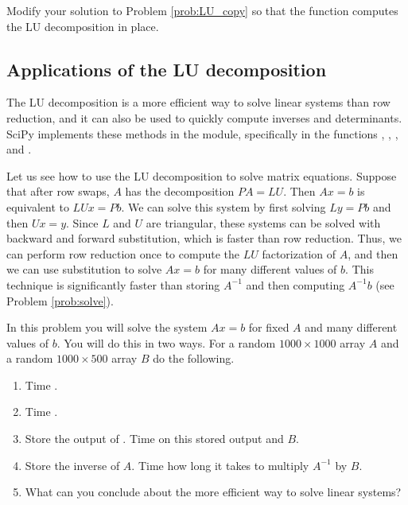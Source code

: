 \begin{problem}
Modify your solution to Problem \ref{prob:LU_copy} so that the function computes the LU decomposition in place.
\end{problem}

\subsection*{Applications of the LU decomposition} %

The LU decomposition is a more efficient way to solve linear systems than row reduction, and it can also be used to quickly compute inverses and determinants.
SciPy implements these methods in the  module, specifically in the functions , , , and .

Let us see how to use the LU decomposition to solve matrix equations.
Suppose that after row swaps, $A$ has the decomposition $PA = LU$.
Then $Ax=b$ is equivalent to $LUx=Pb$.
We can solve this system by first solving $Ly = Pb$ and then $Ux = y$.
Since $L$ and $U$ are triangular, these systems can be solved with backward and forward substitution, which is faster than row reduction.
Thus, we can perform row reduction once to compute the $LU$ factorization of $A$, and then we can use substitution to solve $Ax=b$ for many different values of $b$.
This technique is significantly faster than storing $A^{-1}$ and then computing $A^{-1}b$ (see Problem \ref{prob:solve}).

\begin{problem}\label{prob:solve}
In this problem you will solve the system $Ax = b$ for fixed $A$ and many different values of $b$.
You will do this in two ways.
For a random $1000 \times 1000$ array $A$ and a random $1000 \times 500$ array $B$ do the following.
\begin{enumerate}
\item Time .
\item Time .
\item Store the output of . Time  on this stored output and $B$.
\item Store the inverse of $A$. Time how long it takes to multiply $A^{-1}$ by $B$.
\item What can you conclude about the more efficient way to solve linear systems?
\end{enumerate}
\end{problem}

